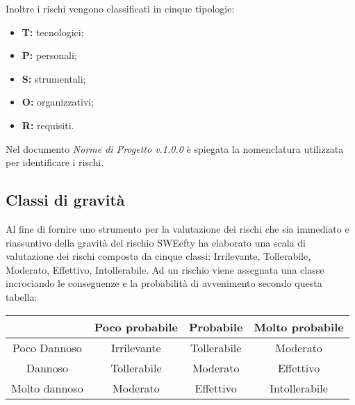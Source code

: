 Inoltre i rischi vengono classificati in cinque tipologie:
\begin{itemize}
	\item \textbf{T:} tecnologici;
	\item \textbf{P:} personali;
	\item \textbf{S:} strumentali;
	\item \textbf{O:} organizzativi;
	\item \textbf{R:} requisiti.
\end{itemize}

Nel documento \emph{Norme di Progetto v.1.0.0} è spiegata la nomenclatura utilizzata per identificare i rischi.

\subsection{Classi di gravità}
Al fine di fornire uno strumento per la valutazione dei rischi che sia immediato e riassuntivo della gravità del rischio SWEefty ha elaborato una scala di valutazione dei rischi composta da cinque classi: Irrilevante, Tollerabile, Moderato, Effettivo, Intollerabile. Ad un rischio viene assegnata una classe incrociando le conseguenze e la probabilità di avvenimento secondo questa tabella:
\begin{table}
	\center
	\begin{tabular}{|c|c|c|c|}
		\hline
		~             & Poco probabile & Probabile   & Molto probabile \\ \hline
		Poco Dannoso  & Irrilevante    & Tollerabile & Moderato        \\ \hline
		Dannoso       & Tollerabile    & Moderato    & Effettivo       \\ \hline
		Molto dannoso & Moderato       & Effettivo   & Intollerabile   \\
		\hline
	\end{tabular}
\end{table}


